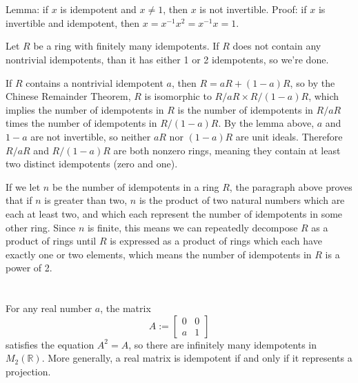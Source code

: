 \documentclass[12pt]{article}
\begin{document}
\section{}
\noindent{}\bigskip\par
Lemma: if $x$ is idempotent and $x \neq 1$, then $x$ is not invertible. Proof: if $x$ is invertible and idempotent, then $x=x^{-1}x^2=x^{-1}x=1$.
\par
Let $R$ be a ring with finitely many idempotents. If $R$ does not contain any nontrivial idempotents, than it has either 1 or 2 idempotents, so we're done.
\par
If $R$ contains a nontrivial idempotent $a$, then $R=aR+(1-a)R$, so by the Chinese Remainder Theorem, $R$ is isomorphic to $R/aR \times R/(1-a)R$, which implies the number of idempotents in $R$ is the number of idempotents in $R/aR$ times the number of idempotents in $R/(1-a)R$. By the lemma above, $a$ and $1-a$ are not invertible, so neither $aR$ nor $(1-a)R$ are unit ideals. Therefore $R/aR$ and $R/(1-a)R$ are both nonzero rings, meaning they contain at least two distinct idempotents (zero and one).
\par
If we let $n$ be the number of idempotents in a ring $R$, the paragraph above proves that if $n$ is greater than two, $n$ is the product of two natural numbers which are each at least two, and which each represent the number of idempotents in some other ring. Since $n$ is finite, this means we can repeatedly decompose $R$ as a product of rings until $R$ is expressed as a product of rings which each have exactly one or two elements, which means the number of idempotents in $R$ is a power of 2.

\section{}
\noindent{}\bigskip\par
For any real number $a$, the matrix
\[ A := \begin{bmatrix}
    0 & 0 \\
    a & 1
\end{bmatrix} \]
satisfies the equation $A^2=A$, so there are infinitely many idempotents in $M_2( \mathbb{R})$. More generally, a real matrix is idempotent if and only if it represents a projection.
\end{document}
